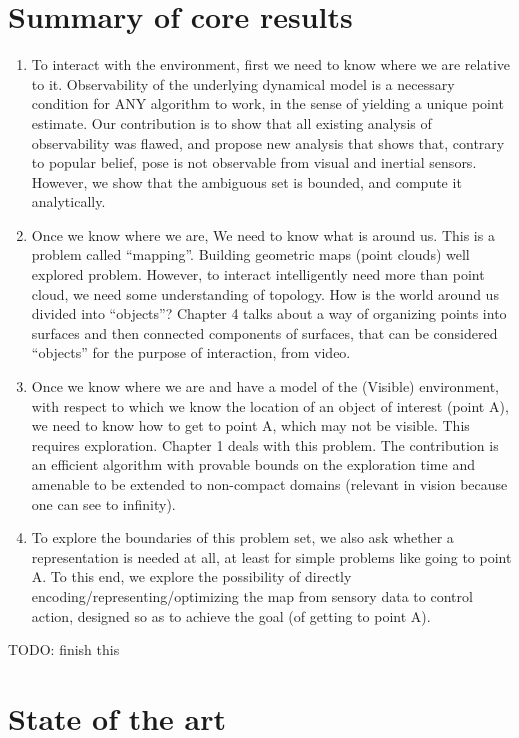 \documentclass [PhD] {uclathes}
\begin{document}
\begin{enumerate}
\section{Summary of core results}
\begin{enumerate}
\item \label{bullet: slam} To interact with the environment, first we need to know where we are relative to it. Observability of the underlying dynamical model is a necessary condition for ANY algorithm to work, in the sense of yielding a unique point estimate. Our contribution is to show that all existing analysis of observability was flawed, and propose new analysis that shows that, contrary to popular belief, pose is not observable from visual and inertial sensors. However, we show that the ambiguous set is bounded, and compute it analytically.
\item \label{bullet: SO} Once we know where we are, We need to know what is around us. This is a problem called ``mapping''. Building geometric maps (point clouds) well explored problem. However, to interact intelligently need more than point cloud, we need some understanding of topology. How is the world around us divided into ``objects''? Chapter 4 talks about a way of organizing points into surfaces and then connected components of surfaces, that can be considered ``objects'' for the purpose of interaction, from video.
\item \label{bullet: exploration} Once we know where we are and have a model of the (Visible) environment, with respect to which we know the location of an object of interest (point A), we need to know how to get to point A, which may not be visible. This requires exploration. Chapter 1 deals with this problem. The contribution is an efficient algorithm with provable bounds on the exploration time and amenable to be extended to non-compact domains (relevant in vision because one can see to infinity).
\item \label{bullet: rep-redux} To explore the boundaries of this problem set, we also ask whether a representation is needed at all, at least for simple problems like going to point A. To this end, we explore the possibility of directly encoding/representing/optimizing the map from sensory data to control action, designed so as to achieve the goal (of getting to point A).
\end{enumerate}

\iffalse TODO: finish this
\section{State of the art}


\end{enumerate}
\end{document}
